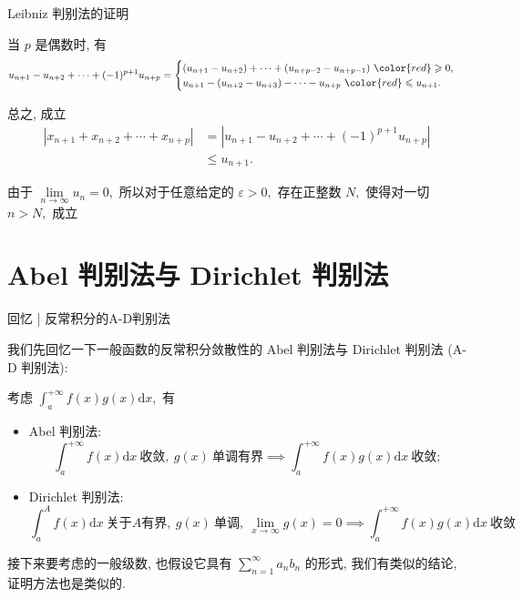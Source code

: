 
\begin{frame}{Leibniz 判别法的证明}

当 $p$ 是偶数时, 有
\[
u_{n+1} - u_{n+2} + \cdots + (-1)^{p+1} u_{n+p}
= \begin{cases}
(u_{n+1} - u_{n+2}) + \cdots + (u_{n+p-2} - u_{n+p-1}) ~ {\color{red} \geqslant 0}, \\
u_{n+1} - (u_{n+2} - u_{n+3}) - \cdots - u_{n+p} ~ {\color{red} \leqslant u_{n+1}}.
\end{cases}
\]

\pause

总之, 成立
\begin{align*}
\left\lvert x_{n+1} + x_{n+2} + \cdots + x_{n+p} \right\rvert & = \left\lvert u_{n+1} - u_{n+2} + \cdots + (-1)^{p+1} u_{n+p} \right\rvert \\
& \leqslant u_{n+1}.
\end{align*}

由于 $\lim\limits_{n\to\infty} u_n = 0,$ 所以对于任意给定的 $\varepsilon > 0,$ 存在正整数 $N,$ 使得对一切 $n > N,$ 成立

\end{frame}


\section[A-D 判别法]{Abel 判别法与 Dirichlet 判别法}


\begin{frame}{回忆 | {\smaller[2] 反常积分的A-D判别法}}

我们先回忆一下一般函数的反常积分敛散性的 Abel 判别法与 Dirichlet 判别法 (A-D 判别法):

\pause

考虑 $\int_a^{+\infty} f(x)g(x) \mathrm{d} x,$ 有
\begin{itemize}
\item[(1)] Abel 判别法:
\[\int_a^{+\infty} f(x) \mathrm{d} x ~ \text{收敛}, ~ g(x) ~ \text{单调有界} \implies \int_a^{+\infty} f(x)g(x) \mathrm{d} x ~ \text{收敛};\]
\item[(2)] Dirichlet 判别法:
\[\int_a^{A} f(x) \mathrm{d} x ~ \text{关于$A$有界}, ~ g(x) ~ \text{单调}, ~ \lim\limits_{x\to\infty} g(x) = 0 \implies \int_a^{+\infty} f(x)g(x) \mathrm{d} x ~ \text{收敛}\]
\end{itemize}

\pause

接下来要考虑的一般级数, 也假设它具有 $\sum\limits_{n=1}^{\infty} a_n b_n$ 的形式, 我们有类似的结论, 证明方法也是类似的.

\end{frame}

